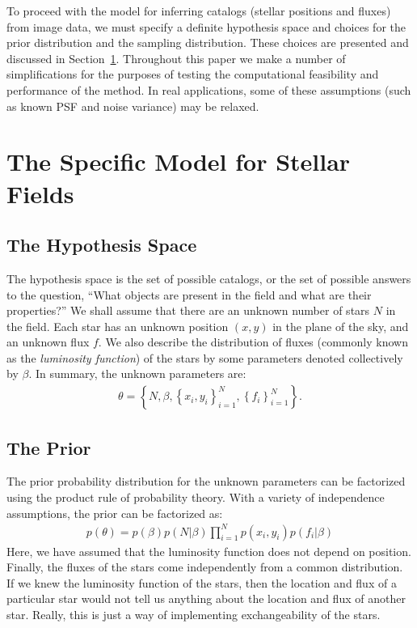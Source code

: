 \documentclass[manuscript]{aastex}
\begin{document}
To proceed with the model for inferring catalogs (stellar positions and fluxes)
from image data, we must
specify a definite hypothesis space and choices for the prior distribution
and the sampling distribution. These choices are presented and discussed in
Section~\ref{sec:model}. Throughout this paper we make a number of simplifications
for the purposes of testing the computational feasibility and performance of
the method. In real applications, some of these assumptions (such as known PSF
and noise variance) may be relaxed.

\section{The Specific Model for Stellar Fields}\label{sec:model}
\subsection{The Hypothesis Space}
The hypothesis space is the set of possible catalogs, or the set of possible
answers to the question, ``What objects are present in the field and
what are their properties?'' We shall assume that there are an unknown number of stars
$N$ in the field. Each star has an unknown
position $(x,y)$ in the plane of the sky, and an unknown flux $f$. We also
describe the distribution of fluxes (commonly known as the {\it luminosity
function}) of the stars by some parameters denoted collectively by $\beta$.
In summary, the unknown parameters are:
\begin{eqnarray}
\theta = \left\{N, \beta, \left\{x_i, y_i\right\}_{i=1}^N, 
\left\{f_i\right\}_{i=1}^N\right\}.
\end{eqnarray}

\subsection{The Prior}
The prior probability distribution for the unknown parameters can be factorized
using the product rule of probability theory.
With a variety of independence assumptions, the prior
can be factorized as:
\begin{eqnarray}
p(\theta) = p(\beta)p(N|\beta)\prod_{i=1}^N p(x_i, y_i)
p(f_i | \beta) 
\end{eqnarray}
Here, we have assumed that the luminosity function does not depend on position.
Finally, the fluxes of the stars come independently from
a common distribution. If we knew the luminosity
function of the stars, then the location and flux of a particular star would
not tell us anything about the location and flux of another star. Really, this
is just a way of implementing exchangeability of the stars.
\end{document}
